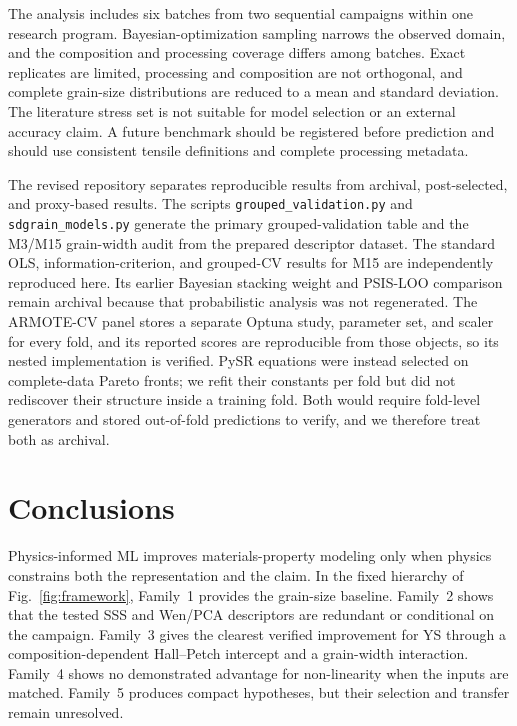 \documentclass[5p,times,twocolumn]{elsarticle}
\begin{document}
The analysis includes six batches from two sequential campaigns within one research program. Bayesian-optimization sampling narrows the observed domain, and the composition and processing coverage differs among batches. Exact replicates are limited, processing and composition are not orthogonal, and complete grain-size distributions are reduced to a mean and standard deviation. The literature stress set is not suitable for model selection or an external accuracy claim. A future benchmark should be registered before prediction and should use consistent tensile definitions and complete processing metadata.

The revised repository separates reproducible results from archival, post-selected, and proxy-based results. The scripts \texttt{grouped\_validation.py} and \texttt{sdgrain\_models.py} generate the primary grouped-validation table and the M3/M15 grain-width audit from the prepared descriptor dataset. The standard OLS, information-criterion, and grouped-CV results for M15 are independently reproduced here. Its earlier Bayesian stacking weight and PSIS-LOO comparison remain archival because that probabilistic analysis was not regenerated. %
The ARMOTE-CV panel stores a separate Optuna study, parameter set, and scaler for every fold, and its reported scores are reproducible from those objects, so its nested implementation is verified. PySR equations were instead selected on complete-data Pareto fronts; we refit their constants per fold but did not rediscover their structure inside a training fold. Both would require fold-level generators and stored out-of-fold predictions to verify, and we therefore treat both as archival.

\section{Conclusions}
\label{sec:conclusions}

Physics-informed ML improves materials-property modeling only when physics constrains both the representation and the claim. In the fixed hierarchy of Fig.~\ref{fig:framework}, Family~1 provides the grain-size baseline. Family~2 shows that the tested SSS and Wen/PCA descriptors are redundant or conditional on the campaign. Family~3 gives the clearest verified improvement for YS through a composition-dependent Hall--Petch intercept and a grain-width interaction. Family~4 shows no demonstrated advantage for non-linearity when the inputs are matched. Family~5 produces compact hypotheses, but their selection and transfer remain unresolved.
\end{document}
